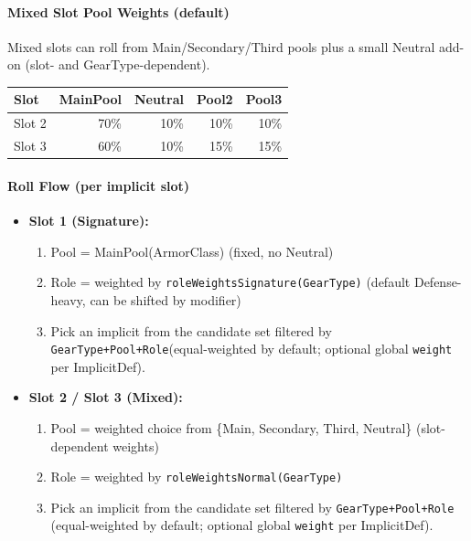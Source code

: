 \paragraph{Mixed Slot Pool Weights (default)}
Mixed slots can roll from Main/Secondary/Third pools plus a small Neutral add-on (slot- and GearType-dependent).
\begin{center}
	\begin{tabular}{|l|r|r|r|r|}
		\hline
		\textbf{Slot} & \textbf{MainPool} & \textbf{Neutral} & \textbf{Pool2} & \textbf{Pool3} \\
		\hline
		Slot 2 & 70\% & 10\% & 10\% & 10\% \\
		Slot 3 & 60\% & 10\% & 15\% & 15\% \\
		\hline
	\end{tabular}
\end{center}

\paragraph{Roll Flow (per implicit slot)}
\begin{itemize}
	\item \textbf{Slot 1 (Signature):}
	\begin{enumerate}
		\item Pool = MainPool(ArmorClass) (fixed, no Neutral)
		\item Role = weighted by \texttt{roleWeightsSignature(GearType)} (default Defense-heavy, can be shifted by modifier)
		\item Pick an implicit from the candidate set filtered by \texttt{GearType+Pool+Role}(equal-weighted by default; optional global \texttt{weight} per ImplicitDef).
	\end{enumerate}
	
	\item \textbf{Slot 2 / Slot 3 (Mixed):}
	\begin{enumerate}
		\item Pool = weighted choice from \{Main, Secondary, Third, Neutral\} (slot-dependent weights)
		\item Role = weighted by \texttt{roleWeightsNormal(GearType)}
		\item Pick an implicit from the candidate set filtered by \texttt{GearType+Pool+Role} (equal-weighted by default; optional global \texttt{weight} per ImplicitDef).
	\end{enumerate}
\end{itemize}

